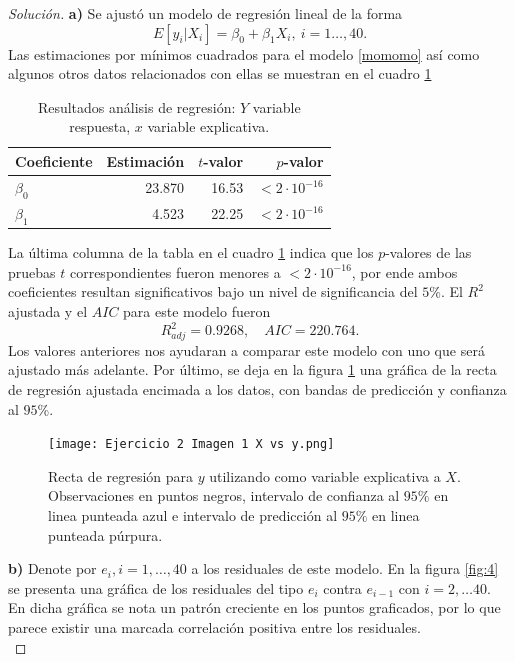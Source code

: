 \documentclass[10.5pt,notitlepage]{article}
\newenvironment{solucion}
  {\begin{proof}[Solución]}
  {\end{proof}}
\theoremstyle{plain}
\begin{document}
\begin{solucion}
\noindent \textbf{a)} Se ajustó un modelo de regresión lineal de la forma 
\begin{equation}\label{momomo}
    E[y_{i}|X_{i}] = \beta_{0} + \beta_{1}X_{i}, \ i = 1\hdots,40. 
\end{equation}
Las estimaciones por mínimos cuadrados para el modelo \eqref{momomo} así como algunos otros datos relacionados con ellas se muestran en el cuadro \ref{tab:reg3}
\begin{table}[H]
        \centering
        \begin{tabular}{@{}l@{\hskip 0.3in}r@{\hskip 0.3in}r@{\hskip 0.3in}r@{}}
            \toprule
            Coeficiente& Estimación & \(t\)-valor& \(p\)-valor \\
            \midrule
            \(\beta_0\) & 23.870 & 16.53   &  \(<2\cdot10^{-16}\)\\ 
            \(\beta_1\) & 4.523  & 22.25   & \(<2\cdot10^{-16}\)\\ 
            \bottomrule
        \end{tabular}
        \caption{Resultados análisis de regresión: \(Y\) variable respuesta, \(x\) variable explicativa.}
        \label{tab:reg3}
\end{table}
La última columna de la tabla en el cuadro \ref{tab:reg3} indica que los \(p\)-valores de las pruebas \(t\) correspondientes fueron menores a \(<2\cdot10^{-16}\), por ende ambos coeficientes resultan significativos bajo un nivel de significancia del \(5\%\). El \(R^2\) ajustada y el \(AIC\) para este modelo fueron 
\begin{equation}\label{Raju y aic 1}
    R^{2}_{adj} = 0.9268, \quad AIC = 220.764.
\end{equation}
Los valores anteriores nos ayudaran a comparar este modelo con uno que será ajustado más adelante. Por último, se deja en la figura \ref{fig:3} una gráfica de la recta de regresión ajustada encimada a los datos, con bandas de predicción y confianza al \(95\%\).\\ 
\begin{figure}[htb]
 \centering
 \texttt{[image: Ejercicio 2 Imagen 1 X vs y.png]}
 \caption{Recta de regresión para \(y\) utilizando como variable explicativa a \(X\). Observaciones en puntos negros, intervalo de confianza al \(95\%\) en linea punteada azul e intervalo de predicción al \(95\%\) en linea punteada púrpura.}
\label{fig:3}
\end{figure}

\noindent \textbf{b)} Denote por \(e_i, i = 1,\hdots,40\) a los residuales de este modelo. En la figura \ref{fig:4} se presenta una gráfica de los residuales del tipo \(e_{i}\) contra \(e_{i-1}\) con \(i = 2, \hdots 40\). En dicha gráfica se nota un patrón creciente en los puntos graficados, por lo que parece existir una marcada correlación positiva entre los residuales.\\ 


\end{solucion}
\end{document}
